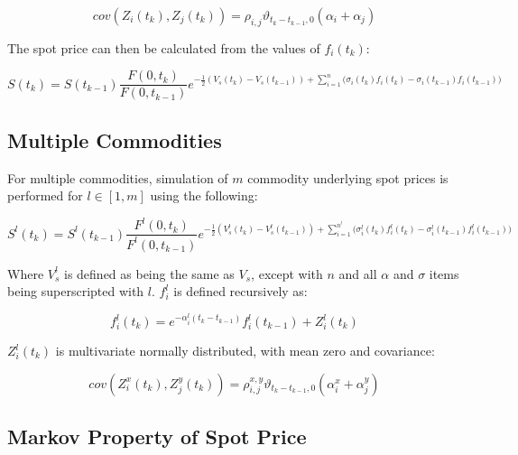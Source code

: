 \documentclass{article}
\begin{document}
\begin{equation}
    cov(Z_i(t_k), Z_j(t_k)) = \rho_{i, j} \vartheta_{t_k-t_{k-1}, 0}(\alpha_i + \alpha_j)
\end{equation}

\bigskip

The spot price can then be calculated from the values of $f_i(t_k)$:

\begin{equation}
    \label{eq:appendix_spot_sim}
    S(t_k) = S(t_{k-1}) \frac{F(0, t_k)}{F(0, t_{k-1})} e^{- \frac{1}{2} (V_s(t_k) - 
    V_s(t_{k-1})) + \sum_{i=1}^n \bigl(\sigma_i(t_k)f_i(t_k) - \sigma_i(t_{k-1})f_i(t_{k-1})\bigr)}
\end{equation}

\subsection{Multiple Commodities}
For multiple commodities, simulation of $m$ commodity underlying spot prices is 
performed for $l \in [1, m]$ using the following:

\begin{equation}
    S^l(t_k) = S^l(t_{k-1}) \frac{F^l(0, t_k)}{F^l(0, t_{k-1})} e^{- \frac{1}{2} (V_s^l(t_k) - 
    V_s^l(t_{k-1})) + \sum_{i=1}^{n^l} \bigl(\sigma_i^l(t_k)f_i^l(t_k) - \sigma_i^l(t_{k-1})f_i^l(t_{k-1})\bigr)}
\end{equation}

Where $V_s^l$ is defined as being the same as $V_s$, except with $n$ and all $\alpha$ and 
$\sigma$ items being superscripted with $l$. $f_i^l$ is defined recursively as:

\begin{equation}
    f_i^l(t_k) = e^{-\alpha_i^l(t_k - t_{k-1})}f_i^l(t_{k-1}) + Z_i^l(t_k)
\end{equation}

$Z_i^l(t_k)$ is multivariate normally distributed, with mean zero and covariance:

\begin{equation}
    \label{eq:appendix_z_covar}
    cov(Z_i^x(t_k), Z_j^y(t_k)) = \rho_{i, j}^{x, y} \vartheta_{t_k-t_{k-1}, 0}(\alpha_i^x + \alpha_j^y)
\end{equation}

\subsection{Markov Property of Spot Price}
\end{document}
